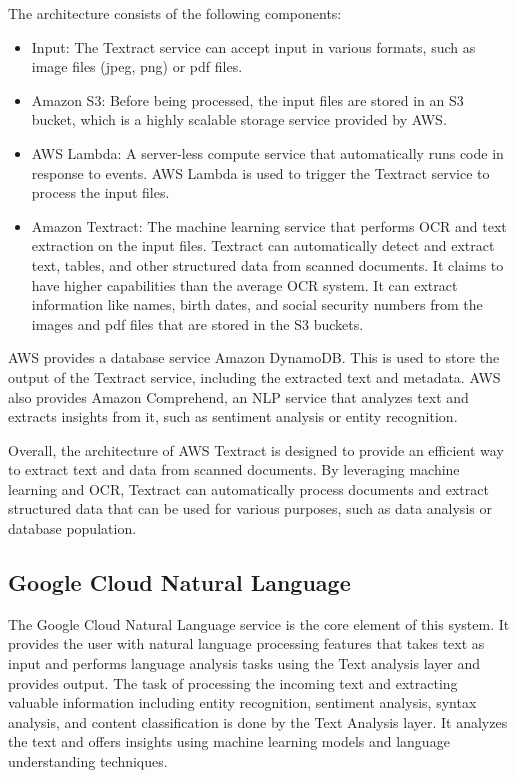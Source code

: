 The architecture consists of the following components:
\begin{itemize}
    \item Input: The Textract service can accept input in various formats, such as image files (\acs{jpeg}, \acs{png}) or \acs{pdf} files.
    \item Amazon S3: Before being processed, the input files are stored in an S3 bucket, which is a highly scalable storage service provided by \acs{AWS}.
    \item \acs{AWS} Lambda: A server-less compute service that automatically runs code in response to events. \acs{AWS} Lambda is used to trigger the Textract service to process the input files.
    \item Amazon Textract: The machine learning service that performs \acs{OCR} and text extraction on the input files. Textract can automatically detect and extract text, tables, and other structured data from scanned documents. It claims \cite{urlAmazonTextract} to have higher capabilities than the average \acs{OCR} system.  It can extract information like names, birth dates, and social security numbers from the images and \acs{pdf} files that are stored in the S3 buckets. 
\end{itemize}

\acs{AWS} provides a database service Amazon DynamoDB. This is used to store the output of the Textract service, including the extracted text and metadata. \acs{AWS} also provides Amazon Comprehend, an \acs{NLP} service that analyzes text and extracts insights from it, such as sentiment analysis or entity recognition.

Overall, the architecture of \acs{AWS} Textract is designed to provide an efficient way to extract text and data from scanned documents. By leveraging machine learning and \acs{OCR}, Textract can automatically process documents and extract structured data that can be used for various purposes, such as data analysis or database population.

\subsection{Google Cloud Natural Language}

The Google Cloud Natural Language service is the core element of this system. It provides the user with natural language processing features that takes text as input and performs language analysis tasks using the Text analysis layer and provides output. The task of processing the incoming text and extracting valuable information including entity recognition, sentiment analysis, syntax analysis, and content classification is done by the Text Analysis layer. It analyzes the text and offers insights using machine learning models and language understanding techniques.

